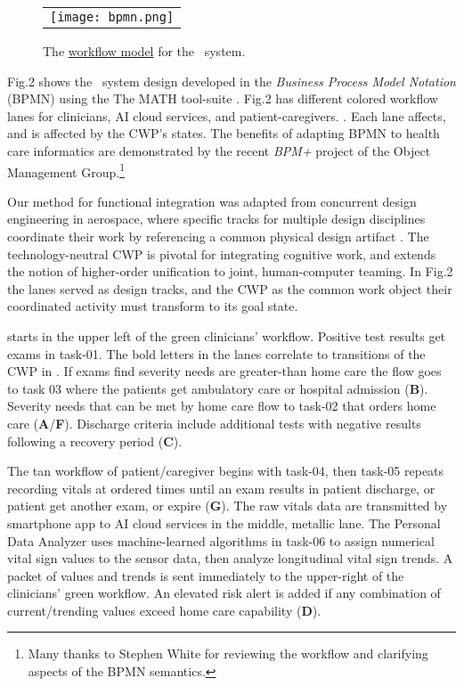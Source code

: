\begin{figure*}
  \begin{center}
    \begin{tabular}{c}
      \texttt{[image: bpmn.png]}
    \end{tabular}
  \end{center}
\caption{The \href{https://github.com/ericmercer/SPIN-bpmn-cwp-verification-paper/blob/main/26-Oct-2021-BPMN.png}{workflow model} for the \phware\ system.}
\label{fig:bpmn}
\end{figure*}

Fig.2 shows the \phware\ system design developed in the \emph{Business Process Model Notation} (BPMN) \cite{BPMN} using the The MATH tool-suite \cite{workflowmodel}.
Fig.2 has different colored workflow lanes for clinicians, AI cloud services, and patient-caregivers. .
Each lane affects, and is affected by the CWP's states.
The benefits of adapting BPMN to health care informatics are demonstrated by the recent \emph{BPM+} project of the Object Management Group.\footnote{Many thanks to Stephen White for reviewing the workflow and clarifying aspects of the BPMN semantics.}

Our method for functional integration was adapted from concurrent design engineering in aerospace, where specific tracks for multiple design disciplines coordinate their work by referencing a common physical design artifact \cite{10.1007/978-1-4471-1538-0_9}.
The technology-neutral CWP is pivotal for integrating cognitive work, and extends the notion of higher-order unification \cite{10.1007/3-540-45685-6_2} to joint, human-computer teaming. 
In Fig.2 the lanes served as design tracks, and the CWP as the common work object their coordinated activity must transform to its goal state.

 starts in the upper left of the green clinicians' workflow.
Positive test results get exams in task-01. The bold letters in the lanes correlate to transitions of the CWP in .
If exams find severity needs are greater-than home care the flow goes to task 03 where the patients get ambulatory care or hospital admission (\textbf{B}).
Severity needs that can be met by home care flow to task-02 that orders home care (\textbf{A}/\textbf{F}).
Discharge criteria include additional tests with negative results following a recovery period (\textbf{C}).

The tan workflow of patient/caregiver begins with task-04, then task-05 repeats recording vitals at ordered times until an exam results in patient discharge, or patient get another exam, or expire (\textbf{G}). 
The raw vitals data are transmitted by smartphone app to AI cloud services in the middle, metallic lane. The Personal Data Analyzer uses machine-learned algorithms in task-06 to assign numerical vital sign values to the sensor data, then analyze longitudinal vital sign trends.
A packet of values and trends is sent immediately to the upper-right of the clinicians' green workflow. An elevated risk alert is added if any combination of current/trending values exceed home care capability (\textbf{D}).

